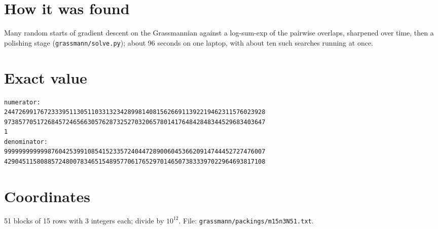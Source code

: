 \documentclass[11pt,a4paper]{article}
\begin{document}
\section{How it was found}
Many random starts of gradient descent on the Grassmannian against a log-sum-exp of the pairwise overlaps, sharpened over time, then a polishing stage (\texttt{grassmann/solve.py}); about 96 seconds on one laptop, with about ten such searches running at once.


\appendix
\section{Exact value}
{\small
\begin{verbatim}
numerator:
244726991767233395113051103313234289981408156266911392219462311576023928
973857705172684572465663057628732527032065780141764842848344529683403647
1
denominator:
999999999999876042539910854152335724044728900604536620914744452727476007
429045115808857248007834651548957706176529701465073833397022964693817108
\end{verbatim}}

\section{Coordinates}
51 blocks of 15 rows with 3 integers each; divide by $10^{12}$. File: \texttt{grassmann/packings/m15n3N51.txt}.
{\tiny
\begin{multicols}{3}
\end{multicols}}
\end{document}
